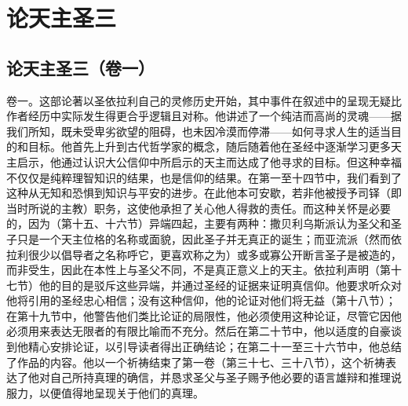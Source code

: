 
\chapter{论天主圣三}




\section{论天主圣三（卷一）}

卷一。这部论著以圣依拉利自己的灵修历史开始，其中事件在叙述中的呈现无疑比作者经历中实际发生得更合乎逻辑且对称。他讲述了一个纯洁而高尚的灵魂——据我们所知，既未受卑劣欲望的阻碍，也未因冷漠而停滞——如何寻求人生的适当目的和目标。他首先上升到古代哲学家的概念，随后随着他在圣经中逐渐学习更多天主启示，他通过认识大公信仰中所启示的天主而达成了他寻求的目标。但这种幸福不仅仅是纯粹理智知识的结果，也是信仰的结果。在第一至十四节中，我们看到了这种从无知和恐惧到知识与平安的进步。在此他本可安歇，若非他被授予司铎（即当时所说的主教）职务，这使他承担了关心他人得救的责任。而这种关怀是必要的，因为（第十五、十六节）异端四起，主要有两种：撒贝利乌斯派认为圣父和圣子只是一个天主位格的名称或面貌，因此圣子并无真正的诞生；而亚流派（然而依拉利很少以倡导者之名称呼它，更喜欢称之为）或多或寡公开断言圣子是被造的，而非受生，因此在本性上与圣父不同，不是真正意义上的天主。依拉利声明（第十七节）他的目的是驳斥这些异端，并通过圣经的证据来证明真信仰。他要求听众对他将引用的圣经忠心相信；没有这种信仰，他的论证对他们将无益（第十八节）；在第十九节中，他警告他们类比论证的局限性，他必须使用这种论证，尽管它因他必须用来表达无限者的有限比喻而不充分。然后在第二十节中，他以适度的自豪谈到他精心安排论证，以引导读者得出正确结论；在第二十一至三十六节中，他总结了作品的内容。他以一个祈祷结束了第一卷（第三十七、三十八节），这个祈祷表达了他对自己所持真理的确信，并恳求圣父与圣子赐予他必要的语言雄辩和推理说服力，以便值得地呈现关于他们的真理。\par

